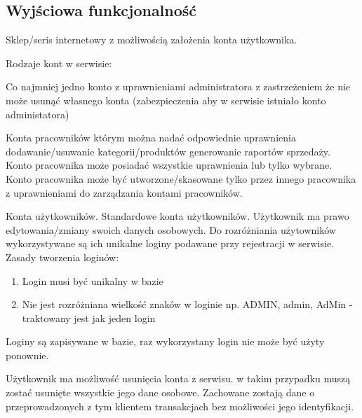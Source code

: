 \subsection{Wyjściowa funkcjonalność}

Sklep/seris internetowy z możliwością założenia konta użytkownika.
	
Rodzaje kont w serwisie:
	
Co najmniej jedno konto z uprawnieniami administratora z zastrzeżeniem że nie może usunąć własnego konta (zabezpieczenia aby w serwisie istniało konto administatora)

Konta pracowników którym można nadać odpowiednie uprawnienia dodawanie/usuwanie kategorii/produktów generowanie raportów sprzedaży. Konto pracownika może posiadać wszystkie uprawnienia lub tylko wybrane. Konto pracownika może być utworzone/skasowane tylko przez innego pracownika z uprawnieniami do zarządzania kontami pracowników.

Konta użytkowników. Standardowe konta użytkowników. Użytkownik ma prawo edytowania/zmiany swoich danych osobowych. Do rozróżniania użytowników wykorzystywane są ich unikalne loginy podawane przy rejestracji w serwisie.
Zasady tworzenia loginów:
\begin{enumerate}
\item Login musi być unikalny w bazie
\item Nie jest rozróżniana wielkość znaków w loginie np. ADMIN, admin, AdMin - traktowany jest jak jeden login
\end{enumerate}
Loginy są zapisywane w bazie, raz wykorzystany login nie może być użyty ponownie.

Użytkownik ma możliwość usunięcia konta z serwisu. w takim przypadku muszą zostać usunięte wszystkie jego dane osobowe. Zachowane zostają dane o przeprowadzonych z tym klientem transakcjach bez możliwości jego identyfikacji.

